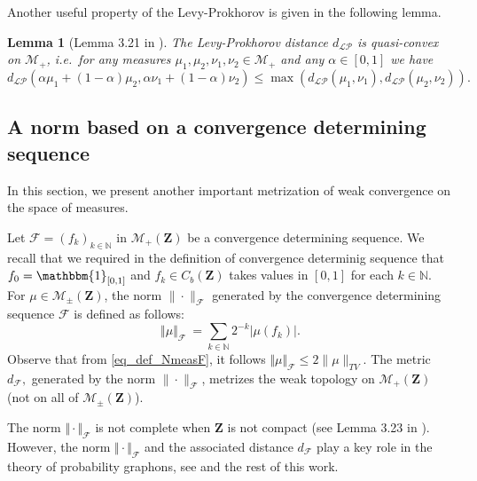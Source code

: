 \documentclass[11pt]{article}
\newtheorem{lemma}[theorem]{Lemma}
\def\N{\mathbb{N}}
\newcommand{\cF}{{\mathcal F}}  %
\newcommand{\Space}{\mathbf{Z}}
\newcommand{\Meas}{\mathcal{M}_+(\Space)}
\newcommand{\SignedMeas}{\mathcal{M}_{\pm}(\Space)}
\newcommand{\CbFunct}{C_b(\Space)}
\newcommand{\NmeasF}[1]{\Vert#1\Vert_{\mathcal{F}}}
\newcommand{\NmeasFSymbol}{\Vert\cdot\Vert_{\mathcal{F}}}
\newcommand{\F}{\mathcal{F}}
\begin{document}
Another useful property of the Levy-Prokhorov is given in the following lemma.




\begin{lemma}[Lemma 3.21 in \cite{abraham2023probabilitygraphons}]\label{LemmaQuasi-convProhorov}
    The Levy-Prokhorov distance $d_{\mathcal{LP}}$ is quasi-convex on $\mathcal{M}_{+}$, i.e.\ for any measures $\mu_1,\mu_2,\nu_1,\nu_2 \in \mathcal{M}_{+} $ and any $\alpha \in [0,1]$ we have $$
    d_{\mathcal{LP}}(\alpha \mu_1+(1-\alpha)\mu_2,\alpha \nu_1+(1-\alpha)\nu_2)\leq \max(d_{\mathcal{LP}}(\mu_1, \nu_1),d_{\mathcal{LP}}( \mu_2,\nu_2)).    
    $$
\end{lemma}





\subsection{A norm  based on a convergence determining sequence}
	\label{subsection_norm_F}

In this section, we present another important metrization of weak convergence on the space of measures.

Let $\F=(f_k  )_{k\in\N}$ in $\Meas$ be a convergence determining sequence. We recall that we required in the definition of convergence determinig sequence that $f_0=\mathbbm{1}_{[0,1]}$ and $f_k \in\CbFunct$ takes values in $[0, 1]$ for each $k\in\N.$ For $\mu\in \SignedMeas$, the norm $\|\cdot\|_{\cF}$ generated by the convergence determining sequence $\cF$ is defined as follows: 
\begin{equation}\label{eq_def_NmeasF}
\NmeasF{\mu}\ = \sum_{k\in \N} 2^{-k} |\mu(f_k)|.
\end{equation}
Observe that from \eqref{eq_def_NmeasF}, it follows $\NmeasF{\mu} \leq 2\|\mu\|_{TV}.$ The metric $d_{\cF},$ generated by the norm $\|\cdot\|_{\cF}$, metrizes the weak topology on $\Meas$ (not on all of $\SignedMeas$). 


The norm $\NmeasFSymbol$  is not complete when  $\Space$ is
not compact (see Lemma  3.23 in \cite{abraham2023probabilitygraphons}). However, the norm $\NmeasFSymbol$ and the associated distance $d_{\cF}$ play a key role in the theory of probability graphons, see \cite{abraham2023probabilitygraphons} and the rest of this work.
\end{document}
